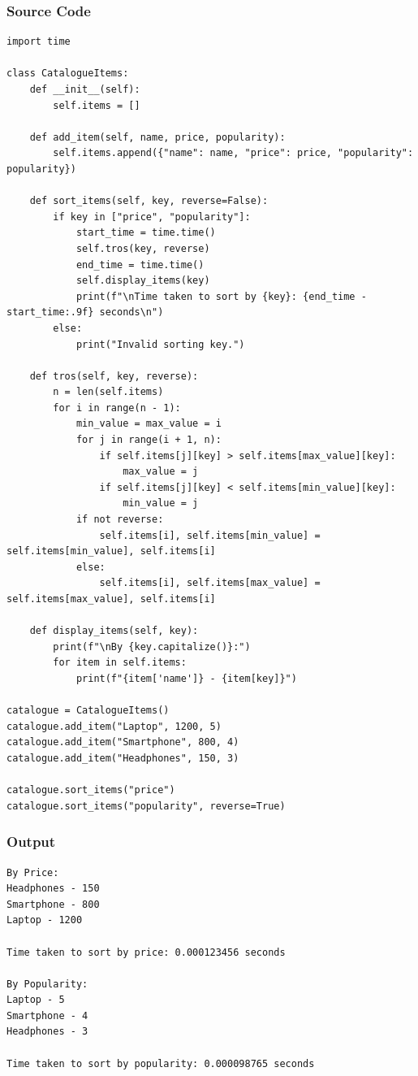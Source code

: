 \documentclass[a4paper,12pt]{article}
\begin{document}
\subsubsection*{Source Code}
\begin{lstlisting}
import time

class CatalogueItems:
    def __init__(self):
        self.items = []

    def add_item(self, name, price, popularity):
        self.items.append({"name": name, "price": price, "popularity": popularity})

    def sort_items(self, key, reverse=False):
        if key in ["price", "popularity"]:
            start_time = time.time()
            self.tros(key, reverse)
            end_time = time.time()
            self.display_items(key)
            print(f"\nTime taken to sort by {key}: {end_time - start_time:.9f} seconds\n")
        else:
            print("Invalid sorting key.")

    def tros(self, key, reverse):
        n = len(self.items)
        for i in range(n - 1):
            min_value = max_value = i
            for j in range(i + 1, n):
                if self.items[j][key] > self.items[max_value][key]:
                    max_value = j
                if self.items[j][key] < self.items[min_value][key]:
                    min_value = j
            if not reverse:
                self.items[i], self.items[min_value] = self.items[min_value], self.items[i]
            else:
                self.items[i], self.items[max_value] = self.items[max_value], self.items[i]

    def display_items(self, key):
        print(f"\nBy {key.capitalize()}:")
        for item in self.items:
            print(f"{item['name']} - {item[key]}")

catalogue = CatalogueItems()
catalogue.add_item("Laptop", 1200, 5)
catalogue.add_item("Smartphone", 800, 4)
catalogue.add_item("Headphones", 150, 3)

catalogue.sort_items("price") 
catalogue.sort_items("popularity", reverse=True)
\end{lstlisting}

\subsubsection*{Output}
\begin{verbatim}
By Price:
Headphones - 150
Smartphone - 800
Laptop - 1200

Time taken to sort by price: 0.000123456 seconds

By Popularity:
Laptop - 5
Smartphone - 4
Headphones - 3

Time taken to sort by popularity: 0.000098765 seconds
\end{verbatim}
\end{document}
